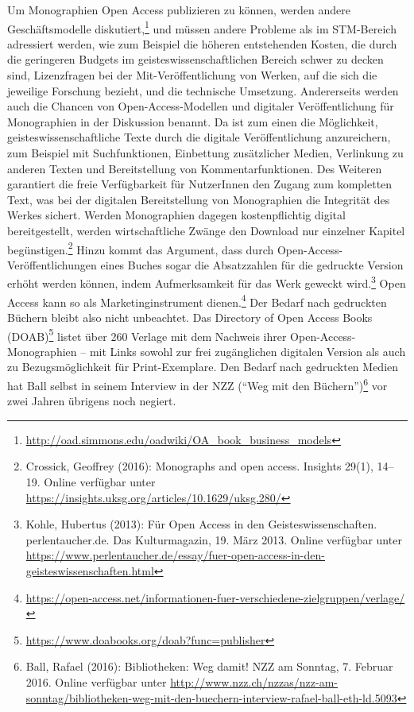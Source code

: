 \documentclass[a4paper,
fontsize=11pt,
oneside,
numbers=noperiodatend,
parskip=half-,
bibliography=totoc,
final
]{scrartcl}
\begin{document}
Um Monographien Open Access publizieren zu können, werden andere
Geschäftsmodelle diskutiert,\footnote{\url{http://oad.simmons.edu/oadwiki/OA_book_business_models}}
und müssen andere Probleme als im STM-Bereich adressiert werden, wie zum
Beispiel die höheren entstehenden Kosten, die durch die geringeren
Budgets im geisteswissenschaftlichen Bereich schwer zu decken sind,
Lizenzfragen bei der Mit-Veröffentlichung von Werken, auf die sich die
jeweilige Forschung bezieht, und die technische Umsetzung. Andererseits
werden auch die Chancen von Open-Access-Modellen und digitaler
Veröffentlichung für Monographien in der Diskussion benannt. Da ist zum
einen die Möglichkeit, geisteswissenschaftliche Texte durch die digitale
Veröffentlichung anzureichern, zum Beispiel mit Suchfunktionen,
Einbettung zusätzlicher Medien, Verlinkung zu anderen Texten und
Bereitstellung von Kommentarfunktionen. Des Weiteren garantiert die
freie Verfügbarkeit für NutzerInnen den Zugang zum kompletten Text, was
bei der digitalen Bereitstellung von Monographien die Integrität des
Werkes sichert. Werden Monographien dagegen kostenpflichtig digital
bereitgestellt, werden wirtschaftliche Zwänge den Download nur einzelner
Kapitel begünstigen.\footnote{Crossick, Geoffrey (2016): Monographs and
  open access. Insights 29(1), 14--19. Online verfügbar unter
  \url{https://insights.uksg.org/articles/10.1629/uksg.280/}} Hinzu
kommt das Argument, dass durch Open-Access-Veröffentlichungen eines
Buches sogar die Absatzzahlen für die gedruckte Version erhöht werden
können, indem Aufmerksamkeit für das Werk geweckt wird.\footnote{Kohle,
  Hubertus (2013): Für Open Access in den Geisteswissenschaften.
  perlentaucher.de. Das Kulturmagazin, 19. März 2013. Online verfügbar
  unter
  \url{https://www.perlentaucher.de/essay/fuer-open-access-in-den-geisteswissenschaften.html}}
Open Access kann so als Marketinginstrument dienen.\footnote{\url{https://open-access.net/informationen-fuer-verschiedene-zielgruppen/verlage/}}
Der Bedarf nach gedruckten Büchern bleibt also nicht unbeachtet. Das
Directory of Open Access Books (DOAB)\footnote{\url{https://www.doabooks.org/doab?func=publisher}}
listet über 260 Verlage mit dem Nachweis ihrer Open-Access-Monographien
-- mit Links sowohl zur frei zugänglichen digitalen Version als auch zu
Bezugsmöglichkeit für Print-Exemplare. Den Bedarf nach gedruckten Medien
hat Ball selbst in seinem Interview in der NZZ (\enquote{Weg mit den
Büchern})\footnote{Ball, Rafael (2016): Bibliotheken: Weg damit! NZZ am
  Sonntag, 7. Februar 2016. Online verfügbar unter
  \url{http://www.nzz.ch/nzzas/nzz-am-sonntag/bibliotheken-weg-mit-den-buechern-interview-rafael-ball-eth-ld.5093}}
vor zwei Jahren übrigens noch negiert.
\end{document}
